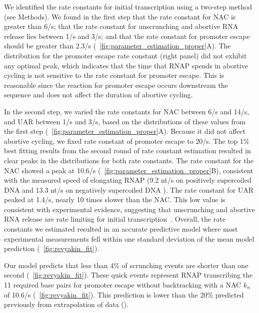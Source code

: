 %

We identified the rate constants for initial transcription using a two-step
method (see Methods). We found in the first step that the rate constant for
NAC is greater than 6/s; that the rate constant for unscrunching and abortive
RNA release lies between 1/s and 3/s; and that the rate constant for promoter
escape should be greater than 2.3/s
(\FIG~\ref{fig:parameter_estimation_proper}A). The distribution for the
promoter escape rate constant (right panel) did not exhibit any optimal peak,
which indicates that the time that RNAP spends in abortive cycling is not
sensitive to the rate constant for promoter escape. This is reasonable since
the reaction for promoter escape occurs downstream the sequence and does not
affect the duration of abortive cycling.   

In the second step, we varied the rate constants for NAC between 6/s and 14/s,
and UAR between 1/s and 3/s, based on the distributions of these values from
the first step (\FIG~\ref{fig:parameter_estimation_proper}A). Because it did
not affect abortive cycling, we fixed rate constant of promoter escape to
20/s. The top 1\% best fitting results from the second round of rate constant
estimation resulted in clear peaks in the distributions for both rate
constants. The rate constant for the NAC showed a peak at 10.6/s
(\FIG~\ref{fig:parameter_estimation_proper}B), consistent with the measured
speed of elongating RNAP (9.2 nt/s on positively supercoiled DNA and 13.3 nt/s
on negatively supercoiled DNA \cite{revyakin_abortive_2006}). The rate
constant for UAR peaked at 1.4/s, nearly 10 times slower than the NAC. This
low value is consistent with experimental evidence, suggesting that
unscrunching and abortive RNA release are rate limiting for initial
transcription~\cite{revyakin_abortive_2006, margeat_direct_2006}. Overall, the
rate constants we estimated resulted in an accurate predictive model where
most experimental measurements fell within one standard deviation of the mean
model prediction (\FIG~\ref{fig:revyakin_fit}). 

  
Our model predicts that less than 4\% of scrunching events are shorter than
one second (\FIG~\ref{fig:revyakin_fit}). These quick events represent RNAP
transcribing the 11 required base pairs for promoter escape without
backtracking with a NAC $k_n$ of 10.6/s
(\FIG~\ref{fig:revyakin_fit}). This prediction is lower than the 20\%
predicted previously from extrapolation of data
(\cite{revyakin_abortive_2006}).  

